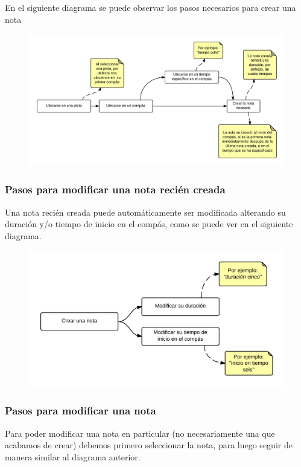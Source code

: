 En el siguiente diagrama se puede observar los pasos necesarios para crear una nota

\begin{figure}[H]
\includegraphics[width=0.9\linewidth]{./graphics/pasos-crear-nota2.png}
\end{figure}
 
\subsubsection{Pasos para modificar una nota reci\'en creada}
Una nota reci\'en creada puede autom\'aticamente ser modificada alterando su duraci\'on y/o 
tiempo de inicio en el comp\'as, como se puede ver en el siguiente diagrama.

\begin{figure}[H]
\includegraphics[width=0.9\linewidth]{./graphics/pasos-modificar-nota-recien-creada.png}
\end{figure}
 
\subsubsection{Pasos para modificar una nota}
Para poder modificar una nota en particular (no necesariamente una que acabamos de crear) debemos 
primero seleccionar la nota, para luego seguir de manera similar al diagrama anterior.

